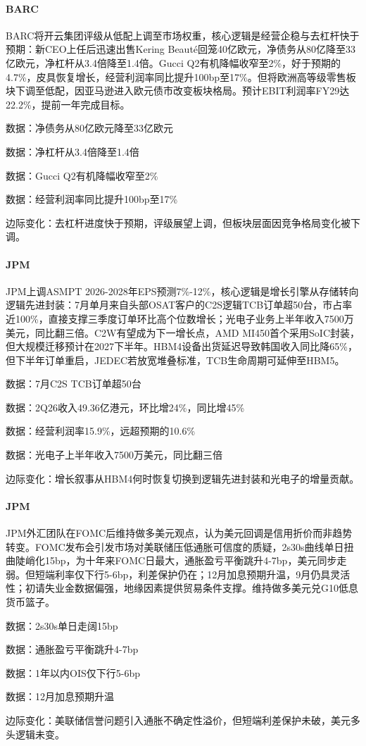 \documentclass[11pt]{ctexart}
\begin{document}
\paragraph{BARC} BARC将开云集团评级从低配上调至市场权重，核心逻辑是经营企稳与去杠杆快于预期：新CEO上任后迅速出售Kering Beauté回笼40亿欧元，净债务从80亿降至33亿欧元，净杠杆从3.4倍降至1.4倍。Gucci Q2有机降幅收窄至2\%，好于预期的4.7\%，皮具恢复增长，经营利润率同比提升100bp至17\%。但将欧洲高等级零售板块下调至低配，因亚马逊进入欧元债市改变板块格局。预计EBIT利润率FY29达22.2\%，提前一年完成目标。
{\small\color{refgray}数据：净债务从80亿欧元降至33亿欧元\par}
{\small\color{refgray}数据：净杠杆从3.4倍降至1.4倍\par}
{\small\color{refgray}数据：Gucci Q2有机降幅收窄至2\%\par}
{\small\color{refgray}数据：经营利润率同比提升100bp至17\%\par}
{\small\color{refgray}边际变化：去杠杆进度快于预期，评级展望上调，但板块层面因竞争格局变化被下调。\par}
\paragraph{JPM} JPM上调ASMPT 2026-2028年EPS预测7\%-12\%，核心逻辑是增长引擎从存储转向逻辑先进封装：7月单月来自头部OSAT客户的C2S逻辑TCB订单超50台，市占率近100\%，直接支撑三季度订单环比高个位数增长；光电子业务上半年收入7500万美元，同比翻三倍。C2W有望成为下一增长点，AMD MI450首个采用SoIC封装，但大规模迁移预计在2027下半年。HBM4设备出货延迟导致韩国收入同比降65\%，但下半年订单重启，JEDEC若放宽堆叠标准，TCB生命周期可延伸至HBM5。
{\small\color{refgray}数据：7月C2S TCB订单超50台\par}
{\small\color{refgray}数据：2Q26收入49.36亿港元，环比增24\%，同比增45\%\par}
{\small\color{refgray}数据：经营利润率15.9\%，远超预期的10.6\%\par}
{\small\color{refgray}数据：光电子上半年收入7500万美元，同比翻三倍\par}
{\small\color{refgray}边际变化：增长叙事从HBM4何时恢复切换到逻辑先进封装和光电子的增量贡献。\par}
\paragraph{JPM} JPM外汇团队在FOMC后维持做多美元观点，认为美元回调是信用折价而非趋势转变。FOMC发布会引发市场对美联储压低通胀可信度的质疑，2s30s曲线单日扭曲陡峭化15bp，为十年来FOMC日最大，通胀盈亏平衡跳升4-7bp，美元同步走弱。但短端利率仅下行5-6bp，利差保护仍在；12月加息预期升温，9月仍具灵活性；初请失业金数据偏强，地缘因素提供贸易条件支撑。维持做多美元兑G10低息货币篮子。
{\small\color{refgray}数据：2s30s单日走阔15bp\par}
{\small\color{refgray}数据：通胀盈亏平衡跳升4-7bp\par}
{\small\color{refgray}数据：1年以内OIS仅下行5-6bp\par}
{\small\color{refgray}数据：12月加息预期升温\par}
{\small\color{refgray}边际变化：美联储信誉问题引入通胀不确定性溢价，但短端利差保护未破，美元多头逻辑未变。\par}
\end{document}
